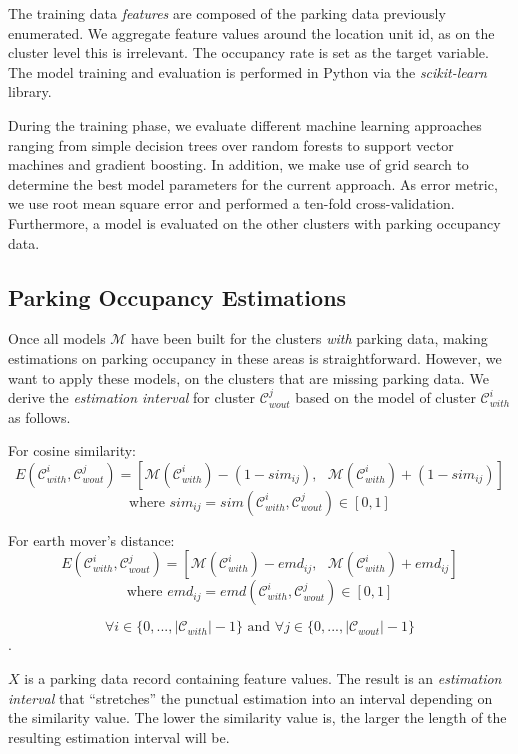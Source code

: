 The training data \textit{features} are composed of the parking data previously enumerated. We aggregate feature values around the location unit id, as on the cluster level this is irrelevant. The occupancy rate is set as the target variable. The model training and evaluation is performed in Python via the \textit{scikit-learn} library.

During the training phase, we evaluate different machine learning approaches ranging from simple decision trees over random forests to support vector machines and gradient boosting. In addition, we make use of grid search to determine the best model parameters for the current approach. As error metric, we use root mean square error and performed a ten-fold cross-validation. Furthermore, a model is evaluated on the other clusters with parking occupancy data.

\subsection{Parking Occupancy Estimations}
\label{realization:parking_occupancy_estimations}
Once all models $\mathcal{M}$ have been built for the clusters \textit{with} parking data, making estimations on parking occupancy in these areas is straightforward. However, we want to apply these models, on the clusters that are missing parking data. We derive the \textit{estimation interval} for cluster $\mathcal{C}_{wout}^j$ based on the model of cluster $\mathcal{C}_{with}^i$ as follows.

For cosine similarity:
\begin{equation}
E(\mathcal{C}_{with}^i,\mathcal{C}_{wout}^j) = [\mathcal{M}(\mathcal{C}_{with}^i) - (1 - sim_{ij}), \text{    } \mathcal{M}(\mathcal{C}_{with}^i) + (1 - sim_{ij})]
\end{equation}
$$\text{where } sim_{ij} = sim(\mathcal{C}_{with}^i,\mathcal{C}_{wout}^j) \in [0,1]$$

For earth mover's distance:
\begin{equation}
E(\mathcal{C}_{with}^i,\mathcal{C}_{wout}^j) = [\mathcal{M}(\mathcal{C}_{with}^i) - emd_{ij},   \text{    }\mathcal{M}(\mathcal{C}_{with}^i) + emd_{ij}]
\end{equation}
$$\text{where } emd_{ij} = emd(\mathcal{C}_{with}^i,\mathcal{C}_{wout}^j) \in [0,1]$$

$$\forall i \in \{0,...,|\mathcal{C}_{with}|-1\} \text{ and } \forall j \in \{0,...,|\mathcal{C}_{wout}|-1\}$$.

$X$ is a parking data record containing feature values.
The result is an \textit{estimation interval} that ``stretches'' the punctual estimation into an interval depending on the similarity value.
The lower the similarity value is, the larger the length of the resulting estimation interval will be.

